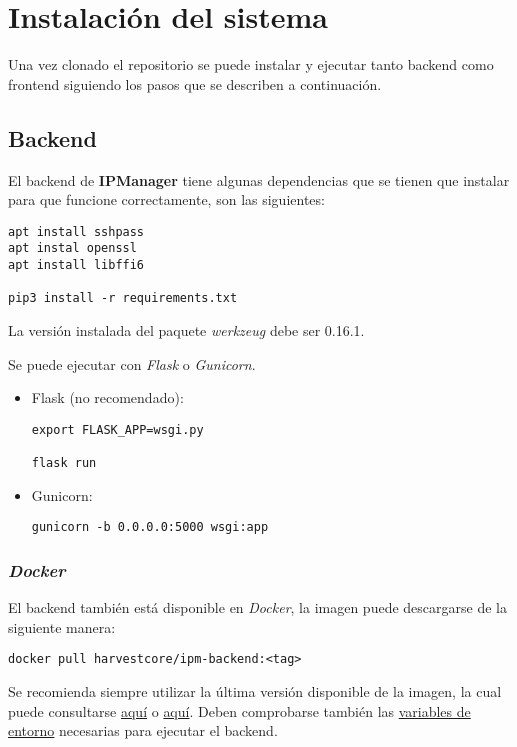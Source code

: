 \chapter{Instalación del sistema}

Una vez clonado el repositorio se puede instalar y ejecutar tanto backend como frontend siguiendo los pasos que se describen a continuación.

\section{Backend}
El backend de \textbf{IPManager} tiene algunas dependencias que se tienen que instalar para que funcione correctamente, son las siguientes:

\begin{lstlisting}
apt install sshpass
apt instal openssl
apt install libffi6

pip3 install -r requirements.txt
\end{lstlisting}

La versión instalada del paquete \textit{werkzeug} debe ser 0.16.1.

Se puede ejecutar con \textit{Flask} o \textit{Gunicorn}.
\begin{itemize}
	\item Flask (no recomendado):
\begin{lstlisting}
export FLASK_APP=wsgi.py

flask run
\end{lstlisting}
	
	\item Gunicorn:
\begin{lstlisting}
gunicorn -b 0.0.0.0:5000 wsgi:app
\end{lstlisting}
	
\end{itemize}

\subsection{\textit{Docker}}
El backend también está disponible en \textit{Docker}, la imagen puede descargarse de la siguiente manera:

\begin{lstlisting}
docker pull harvestcore/ipm-backend:<tag>
\end{lstlisting}

Se recomienda siempre utilizar la última versión disponible de la imagen, la cual puede consultarse \href{https://github.com/harvestcore/tfg/releases}{aquí} o \href{https://hub.docker.com/r/harvestcore/ipm-backend/tags}{aquí}. Deben comprobarse también las \hyperref[sec:variables]{variables de entorno} necesarias para ejecutar el backend.

